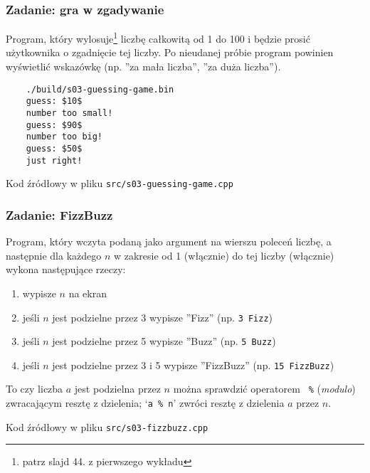 \documentclass[aspectratio=169]{beamer}
\begin{document}
\begin{frame}[fragile]
    \frametitle{Zadanie: gra w zgadywanie}
    \label{lecture_exercise_2}

    Program, który wylosuje\footnote{patrz slajd 44. z pierwszego wykładu}
    liczbę całkowitą od 1 do 100 i będzie prosić użytkownika o zgadnięcie tej
    liczby. Po nieudanej próbie program powinien wyświetlić wskazówkę (np. ''za
    mała liczba'', ''za duża liczba'').

    \begin{lstlisting}
    ./build/s03-guessing-game.bin
    guess: $10$
    number too small!
    guess: $90$
    number too big!
    guess: $50$
    just right!
    \end{lstlisting}

    Kod źródłowy w pliku {\tt src/s03-guessing-game.cpp}
\end{frame}

\begin{frame}[fragile]
    \frametitle{Zadanie: FizzBuzz}
    \label{lecture_exercise_3}

    Program, który wczyta podaną jako argument na wierszu poleceń liczbę, a
    następnie dla każdego $n$ w zakresie od 1 (włącznie) do tej liczby
    (włącznie) wykona następujące rzeczy:

    \begin{enumerate}
        \item wypisze $n$ na ekran
        \item jeśli $n$ jest podzielne przez 3 wypisze ''Fizz'' (np. {\tt 3
            Fizz})
        \item jeśli $n$ jest podzielne przez 5 wypisze ''Buzz'' (np. {\tt 5
            Buzz})
        \item jeśli $n$ jest podzielne przez 3 i 5 wypisze ''FizzBuzz'' (np.
            {\tt 15 FizzBuzz})
    \end{enumerate}

    To czy liczba $a$ jest podzielna przez $n$ można sprawdzić operatorem {\tt
    \%} (\emph{modulo}) zwracającym resztę z dzielenia; `{\tt a \% n}' zwróci
    resztę z dzielenia $a$ przez $n$.

    Kod źródłowy w pliku {\tt src/s03-fizzbuzz.cpp}
\end{frame}
\end{document}
